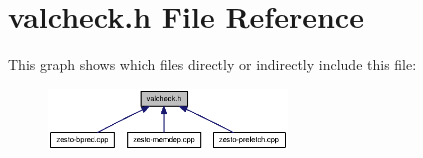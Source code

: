 \section{valcheck.h File Reference}
\label{valcheck_8h}


This graph shows which files directly or indirectly include this file:\nopagebreak
\begin{figure}[H]
\begin{center}
\leavevmode
\includegraphics[width=180pt]{valcheck_8h__dep__incl}
\end{center}
\end{figure}
